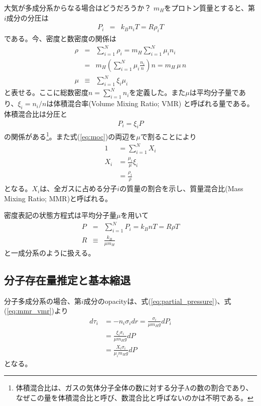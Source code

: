 大気が多成分系からなる場合はどうだろうか？ $m_H$をプロトン質量とすると、第$i$成分の分圧は
\begin{eqnarray}
\label{eq:idealRpa}
P_i &=& k_B n_i T = R \rho_i T 
\end{eqnarray}
である。今、密度と数密度の関係は
\begin{eqnarray}
\label{eq:rhon}
\rho &=& \sum_{i=1}^N \rho_i = m_H \sum_{i=1}^N \mu_i n_i  \\
&=& m_H \left( \sum_{i=1}^N \mu_i \frac{ n_i}{n} \right) n = m_H \, \mu \,n \\
\label{eq:moc}
\mu &\equiv& \sum_{i=1}^N \xi_i \mu_i 
\end{eqnarray}
と表せる。ここに総数密度$n= \sum_{i=1}^N n_i$を定義した。また$\mu$は平均分子量であり、$\xi_i = n_i/n$は体積混合率(Volume Mixing Ratio; VMR) 
と呼ばれる量である。体積混合比は分圧と
\begin{eqnarray}
\label{eq:partial_pressure}
    P_i = \xi_i P
\end{eqnarray}
の関係がある\footnote{体積混合比は、ガスの気体分子全体の数に対する分子Aの数の割合であり、なぜこの量を体積混合比と呼び、数混合比と呼ばないのかは不明である。}。また式(\ref{eq:moc})の両辺を$\mu$で割ることにより
\begin{align}
    1 &=  \sum_{i=1}^N X_i \\
    \label{eq:mmr_vmr}
    X_i &=  \frac{\mu_i}{\mu} \xi_i \\
    & = \frac{\rho_i}{\rho}
\end{align}
となる。$X_i$は、全ガスに占める分子$i$の質量の割合を示し、質量混合比(Mass Mixing Ratio; MMR)と呼ばれる。

密度表記の状態方程式は平均分子量$\mu$を用いて
\begin{eqnarray}
\label{eq:idealRpat}
P &=&  \sum_{i=1}^N P_i = k_B n T = R \rho T  \\
R &\equiv& \frac{k_B}{\mu m_H}
\end{eqnarray}
と一成分系のように扱える。\\


\subsection*{分子存在量推定と基本縮退}

分子多成分系の場合、第$i$成分のopacityは、式(\ref{eq:partial_pressure})、式(\ref{eq:mmr_vmr})より
\begin{align}
d \tau_i &= - n_i \sigma_i d r = \frac{\sigma_i}{\mu m_H g} d P_i \\
&= \frac{\xi_i \sigma_i}{\mu m_H g} d P  \\
\label{eq:MMR_dP_dtau}
&= \frac{X_i \sigma_i}{\mu_i m_H g} d P 
\end{align}
となる。

